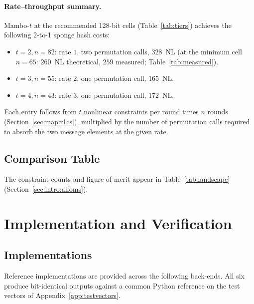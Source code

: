 \documentclass[11pt,a4paper]{article}
\theoremstyle{definition}
\begin{document}
\paragraph{Rate--throughput summary.}
Mambo-$t$ at the recommended 128-bit cells (Table~\ref{tab:tiers})
achieves the following 2-to-1 sponge hash costs:
\begin{itemize}[nosep]
  \item $t\!=\!2, n\!=\!82$: rate $1$, two permutation calls, $328$~NL
        (at the minimum cell $n\!=\!65$: $260$~NL theoretical, $259$
        measured; Table~\ref{tab:measured}).
  \item $t\!=\!3, n\!=\!55$: rate $2$, one permutation call, $165$~NL.
  \item $t\!=\!4, n\!=\!43$: rate $3$, one permutation call, $172$~NL.
\end{itemize}
Each entry follows from $t$ nonlinear constraints per round times $n$ rounds
(Section~\ref{sec:map:r1cs}), multiplied by the number of permutation calls
required to absorb the two message elements at the given rate.



\subsection{Comparison Table}\label{sec:inst:comparison}

The constraint counts and figure of merit appear in
Table~\ref{tab:landscape} (Section~\ref{sec:intro:alfoms}).


\section{Implementation and Verification}\label{sec:implementation}

\subsection{Implementations}\label{sec:impl:systems}

Reference implementations are provided across the following back-ends.
All six produce bit-identical outputs against a common Python reference
on the test vectors of Appendix~\ref{app:testvectors}.
\end{document}
